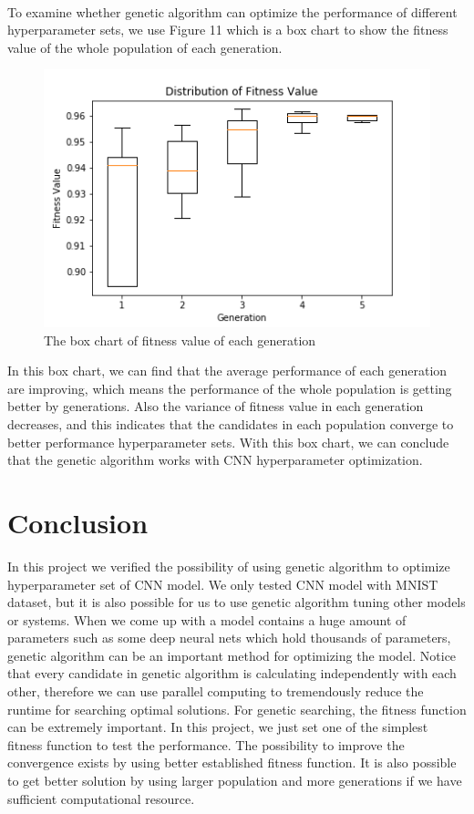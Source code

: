 \documentclass[12pt]{article}
\begin{document}
~\\
To examine whether genetic algorithm can optimize the performance of different hyperparameter sets, we use Figure 11 which is a box chart to show the fitness value of the whole population of each generation. 
\begin{figure}
\begin{center}
\includegraphics[width =5.21in]{fv.png}
\caption{The box chart of fitness value of each generation}
\end{center}
\label{fig:pic11}
\end{figure} 
In this box chart, we can find that the average performance of each generation are improving, which means the performance of the whole population is getting better by generations. Also the variance of fitness value in each generation decreases, and this indicates that the candidates in each population converge to better performance hyperparameter sets. With this box chart, we can conclude that the genetic algorithm works with CNN hyperparameter optimization.
\section{Conclusion}
In this project we verified the possibility of using genetic algorithm to optimize hyperparameter set of CNN model. We only tested CNN model with MNIST dataset, but it is also possible for us to use genetic algorithm tuning other models or systems. When we come up with a model contains a huge amount of parameters such as some deep neural nets which hold thousands of parameters, genetic algorithm can be an important method for optimizing the model. Notice that every candidate in genetic algorithm is calculating independently with each other, therefore we can use parallel computing to tremendously reduce the runtime for searching optimal solutions. For genetic searching, the fitness function can be extremely important. In this project, we just set one of the simplest fitness function to test the performance. The possibility to improve the convergence exists by using better established fitness function. It is also possible to get better solution by using larger population and more generations if we have sufficient computational resource.
\end{document}
